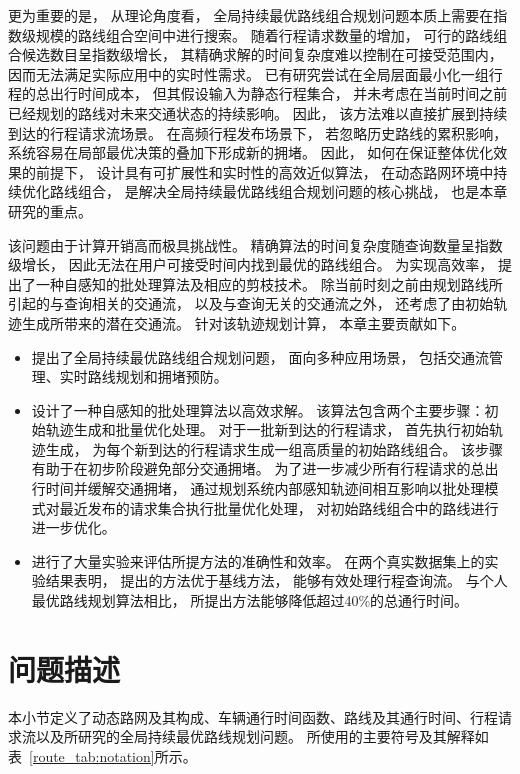 更为重要的是， 从理论角度看， 全局持续最优路线组合规划问题本质上需要在指数级规模的路线组合空间中进行搜索。 随着行程请求数量的增加， 可行的路线组合候选数目呈指数级增长， 其精确求解的时间复杂度难以控制在可接受范围内， 因而无法满足实际应用中的实时性需求。 已有研究尝试在全局层面最小化一组行程的总出行时间成本， 但其假设输入为静态行程集合， 并未考虑在当前时间之前已经规划的路线对未来交通状态的持续影响。 因此， 该方法难以直接扩展到持续到达的行程请求流场景。 在高频行程发布场景下， 若忽略历史路线的累积影响， 系统容易在局部最优决策的叠加下形成新的拥堵。 因此， 如何在保证整体优化效果的前提下， 设计具有可扩展性和实时性的高效近似算法， 在动态路网环境中持续优化路线组合， 是解决全局持续最优路线组合规划问题的核心挑战， 也是本章研究的重点。

该问题由于计算开销高而极具挑战性。 精确算法的时间复杂度随查询数量呈指数级增长， 因此无法在用户可接受时间内找到最优的路线组合。 为实现高效率， 提出了一种自感知的批处理算法及相应的剪枝技术。 除当前时刻之前由规划路线所引起的与查询相关的交通流， 以及与查询无关的交通流之外， 还考虑了由初始轨迹生成所带来的潜在交通流。 针对该轨迹规划计算， 本章主要贡献如下。

\begin{itemize}
    \item 提出了全局持续最优路线组合规划问题， 面向多种应用场景， 包括交通流管理、实时路线规划和拥堵预防。
    \item 设计了一种自感知的批处理算法以高效求解。 该算法包含两个主要步骤：初始轨迹生成和批量优化处理。 对于一批新到达的行程请求， 首先执行初始轨迹生成， 为每个新到达的行程请求生成一组高质量的初始路线组合。 该步骤有助于在初步阶段避免部分交通拥堵。 为了进一步减少所有行程请求的总出行时间并缓解交通拥堵， 通过规划系统内部感知轨迹间相互影响以批处理模式对最近发布的请求集合执行批量优化处理， 对初始路线组合中的路线进行进一步优化。
    \item 进行了大量实验来评估所提方法的准确性和效率。 在两个真实数据集上的实验结果表明， 提出的方法优于基线方法， 能够有效处理行程查询流。 与个人最优路线规划算法相比， 所提出方法能够降低超过40\%的总通行时间。
\end{itemize}

\section{问题描述}
本小节定义了动态路网及其构成、车辆通行时间函数、路线及其通行时间、行程请求流以及所研究的全局持续最优路线规划问题。 所使用的主要符号及其解释如表~\ref{route_tab:notation}所示。

